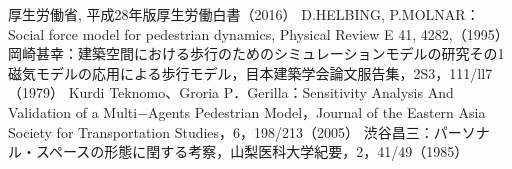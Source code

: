 \begin{thebibliography}{99}
  厚生労働省, 平成28年版厚生労働白書（2016）
  D.HELBING, P.MOLNAR：Social force model for pedestrian dynamics, Physical Review E 41, 4282,（1995）
  岡崎甚幸：建築空間における歩行のためのシミュレーションモデルの研究その1 磁気モデルの応用による歩行モデル，目本建築学会論文服告集，2S3，111/ll7（1979）
  Kurdi Teknomo、Groria P．Gerilla：Sensitivity Analysis And Validation of a Multi−Agents Pedestrian Model，Journal of the Eastern Asia Society for Transportation Studies，6，198/213（2005）
  渋谷昌三：パーソナル・スペースの形態に閏する考察，山梨医科大学紀要，2，41/49（1985）
\end{thebibliography}
